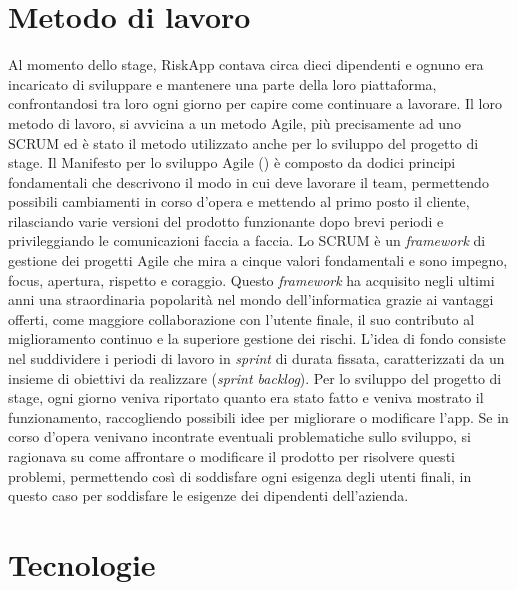 \section{Metodo di lavoro}
Al momento dello stage, RiskApp contava circa dieci dipendenti e ognuno era incaricato di sviluppare e mantenere una parte della loro piattaforma, confrontandosi tra loro ogni giorno per capire come continuare a lavorare.\newline
Il loro metodo di lavoro, si avvicina a un metodo Agile, più precisamente ad uno SCRUM ed è stato il metodo utilizzato anche per lo sviluppo del progetto di stage.\newline
\newline
Il Manifesto per lo sviluppo Agile (\cite{site:manifesto-agile}) è composto da dodici principi fondamentali che descrivono il modo in cui deve lavorare il team, permettendo possibili cambiamenti in corso d'opera e mettendo al primo posto il cliente, rilasciando varie versioni del prodotto funzionante dopo brevi periodi e privileggiando le comunicazioni faccia a faccia.\newline
Lo SCRUM è un \emph{framework} di gestione dei progetti Agile che mira a cinque valori fondamentali e sono impegno, focus, apertura, rispetto e coraggio.\newline
Questo \emph{framework} ha acquisito negli ultimi anni una straordinaria popolarità nel mondo dell’informatica grazie ai vantaggi offerti, come maggiore collaborazione con l’utente finale, il suo contributo al miglioramento continuo e la superiore gestione dei rischi.\newline
L’idea di fondo consiste nel suddividere i periodi di lavoro in \emph{sprint} di durata fissata, caratterizzati da un insieme di obiettivi da realizzare (\emph{sprint backlog}).\newline
\newline
Per lo sviluppo del progetto di stage, ogni giorno veniva riportato quanto era stato fatto e veniva mostrato il funzionamento, raccogliendo possibili idee per migliorare o modificare l'app.\newline
Se in corso d'opera venivano incontrate eventuali problematiche sullo sviluppo, si ragionava su come affrontare o modificare il prodotto per risolvere questi problemi, permettendo così di soddisfare ogni esigenza degli utenti finali, in questo caso per soddisfare le esigenze dei dipendenti dell'azienda.

\section{Tecnologie}

